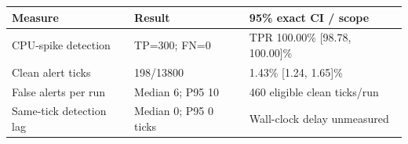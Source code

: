 \begin{tabular}{@{}p{}p{}p{}@{}}
\toprule
\textbf{Measure} & \textbf{Result} & \textbf{95\% exact CI / scope} \\
\midrule
CPU-spike detection & TP=300; FN=0 & TPR 100.00\% [98.78, 100.00]\% \\
Clean alert ticks & 198/13800 & 1.43\% [1.24, 1.65]\% \\
False alerts per run & Median 6; P95 10 & 460 eligible clean ticks/run \\
Same-tick detection lag & Median 0; P95 0 ticks & Wall-clock delay unmeasured \\
\bottomrule
\end{tabular}

